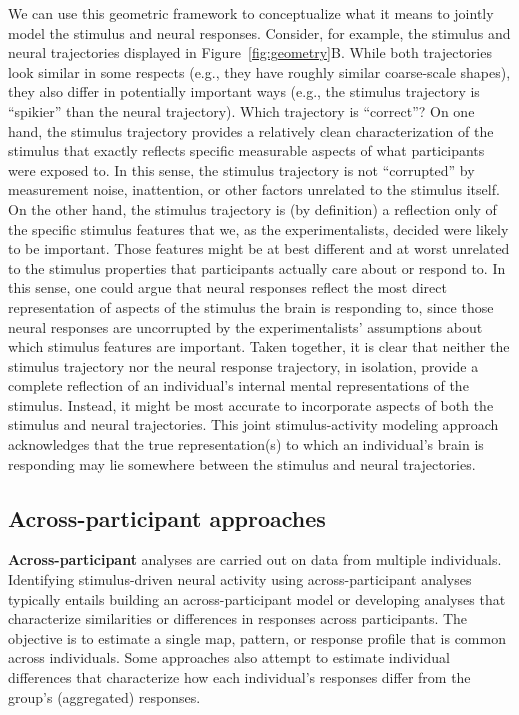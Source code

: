 \documentclass[runningheads]{llncs}
\begin{document}
We can use this geometric framework to conceptualize what it means to
jointly model the stimulus and neural responses.  Consider, for
example, the stimulus and neural trajectories displayed in
Figure~\ref{fig:geometry}B.  While both trajectories look similar in
some respects (e.g., they have roughly similar coarse-scale shapes),
they also differ in potentially important ways (e.g., the stimulus
trajectory is ``spikier'' than the neural trajectory).  Which
trajectory is ``correct''?  On one hand, the stimulus trajectory
provides a relatively clean characterization of the stimulus that
exactly reflects specific measurable aspects of what participants were
exposed to.  In this sense, the stimulus trajectory is not
``corrupted'' by measurement noise, inattention, or other factors
unrelated to the stimulus itself.  On the other hand, the stimulus
trajectory is (by definition) a reflection only of the specific
stimulus features that we, as the experimentalists, decided were
likely to be important.  Those features might be at best different and
at worst unrelated to the stimulus properties that participants
actually care about or respond to.  In this sense, one could argue
that neural responses reflect the most direct representation of
aspects of the stimulus the brain is responding to, since those neural
responses are uncorrupted by the experimentalists' assumptions about
which stimulus features are important.  Taken together, it is clear
that neither the stimulus trajectory nor the neural response
trajectory, in isolation, provide a complete reflection of an
individual's internal mental representations of the stimulus.
Instead, it might be most accurate to incorporate aspects of both the
stimulus and neural trajectories.  This joint stimulus-activity
modeling approach acknowledges that the true representation(s) to
which an individual's brain is responding may lie somewhere between
the stimulus and neural trajectories.

\subsection{Across-participant approaches}
\textbf{Across-participant} analyses are carried out on data from
multiple individuals.  Identifying stimulus-driven neural activity
using across-participant analyses typically entails building an
across-participant model or developing analyses that characterize
similarities or differences in responses across participants.  The
objective is to estimate a single map, pattern, or response profile
that is common across individuals.  Some approaches also attempt to
estimate individual differences that characterize how each
individual's responses differ from the group's (aggregated) responses.
\end{document}
